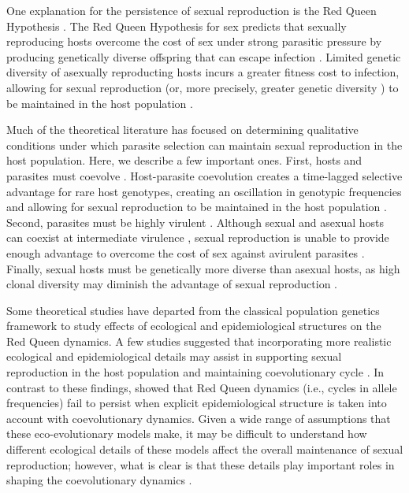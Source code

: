 \documentclass{article}\usepackage[]{graphicx}\usepackage[]{color}
\begin{document}
One explanation for the persistence of sexual reproduction is the Red Queen Hypothesis \citep{bell1982masterpiece}.
The Red Queen Hypothesis for sex predicts that sexually reproducing hosts overcome the cost of sex under strong parasitic pressure by producing genetically diverse offspring that can escape infection \citep{jbs1949disease, jaenike1978hypothesis, hamilton1980sex, hamilton1990sexual}.
Limited genetic diversity of asexually reproducting hosts incurs a greater fitness cost to infection, allowing for sexual reproduction (or, more precisely, greater genetic diversity \citep{king2011parasites}) to be maintained in the host population \citep{ashby2015diversity}.

Much of the theoretical literature has focused on determining qualitative conditions under which parasite selection can maintain sexual reproduction in the host population.
Here, we describe a few important ones.
First, hosts and parasites must coevolve \citep{bell1982masterpiece}.
Host-parasite coevolution creates a time-lagged selective advantage for rare host genotypes, creating an oscillation in genotypic frequencies and allowing for sexual reproduction to be maintained in the host population \citep{clarke1976ecological,jaenike1978hypothesis, hamilton1980sex, agrawal2001parasites}.
Second, parasites must be highly virulent \citep{may1983epidemiology}.
Although sexual and asexual hosts can coexist at intermediate virulence \citep{howard1994parasitism}, sexual reproduction is unable to provide enough advantage to overcome the cost of sex against avirulent parasites \citep{howard1994parasitism}.
Finally, sexual hosts must be genetically more diverse than asexual hosts, as high clonal diversity may diminish the advantage of sexual reproduction \citep{lively1994selection, lively2010review, ashby2015diversity}.

Some theoretical studies have departed from the classical population genetics framework to study effects of ecological and epidemiological structures on the Red Queen dynamics.
A few studies suggested that incorporating more realistic ecological and epidemiological details may assist in supporting sexual reproduction in the host population \citep{lively2009maintenance, lively2010epidemiological} and maintaining coevolutionary cycle \citep{ashby2014parasitic}.
In contrast to these findings, \cite{macpherson2018joint} showed that Red Queen dynamics (i.e., cycles in allele frequencies) fail to persist when explicit epidemiological structure is taken into account with coevolutionary dynamics.
Given a wide range of assumptions that these eco-evolutionary models make, it may be difficult to understand how different ecological details of these models affect the overall maintenance of sexual reproduction;
however, what is clear is that these details play important roles in shaping the coevolutionary dynamics \citep{song2015host, ashby2019understanding}.
\end{document}
